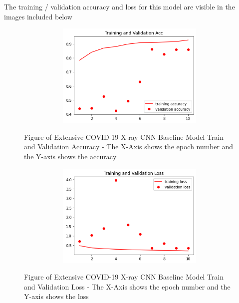 The training / validation accuracy and loss for this model are visible in the images included below
 \begin{figure}[H]
    \centering
    \includegraphics[width=1\textwidth,height=5cm,keepaspectratio]{Images/ExtensiveCOVID19XRayCNNBaselineModelAcc.png}\\
    \caption{Figure of Extensive COVID-19 X-ray CNN Baseline Model Train and Validation Accuracy - The X-Axis shows the epoch number and the Y-axis shows the accuracy}
    \label{fig:Extensive COVID-19 X-ray CNN Baseline ModelTrain and Validation Accuracy}
\end{figure}
 \begin{figure}[H]
    \centering
    \includegraphics[width=1\textwidth,height=5cm,keepaspectratio]{Images/ExtensiveCOVID19XRayCNNBaselineModelLoss.png}\\
    \caption{Figure of Extensive COVID-19 X-ray CNN Baseline Model Train and Validation Loss  - The X-Axis shows the epoch number and the Y-axis shows the loss}
    \label{fig:Extensive COVID-19 X-ray CNN Baseline ModelTrain and Validation Loss}
\end{figure}
